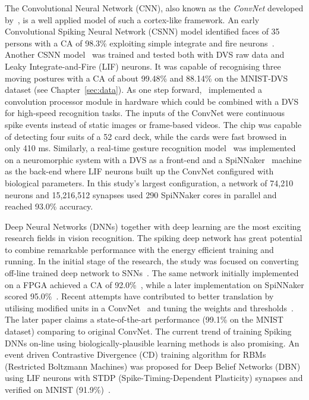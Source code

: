 \documentclass{frontiersENG} %
\begin{document}
The Convolutional Neural Network (CNN), also known as the \textit{ConvNet} developed by~\cite{lecun1998gradient}, is a well applied model of such a cortex-like framework.
An early Convolutional Spiking Neural Network (CSNN) model identified faces of 35 persons with a CA of 98.3\% exploiting simple integrate and fire neurons~\citep{matsugu2002convolutional}.
Another CSNN model~\citep{zhao2014feedforward} was trained and tested both with DVS raw data and Leaky Integrate-and-Fire (LIF) neurons.
It was capable of recognising three moving postures with a CA of about 99.48\% and 88.14\% on the MNIST-DVS dataset (see Chapter~\ref{sec:data}).
As one step forward,~\cite{camunas2012event} implemented a convolution processor module in hardware which could be combined with a DVS for high-speed recognition tasks.
The inputs of the ConvNet were continuous spike events instead of static images or frame-based videos. 
The chip was capable of detecting four suits of a 52 card deck, while the cards were fast browsed in only 410 ms.
Similarly, a real-time gesture recognition model~\citep{liu2014real} was implemented on a neuromorphic system with a DVS as a front-end and a SpiNNaker~\citep{furber2014spinnaker} machine as the back-end where LIF neurons built up the ConvNet configured with biological parameters.
In this study's largest configuration, a network of 74,210 neurons and 15,216,512 synapses used 290 SpiNNaker cores in parallel and reached 93.0\% accuracy. 

Deep Neural Networks (DNNs) together with deep learning are the most exciting research fields in vision recognition.
The spiking deep network has great potential to combine remarkable performance with the energy efficient training and running.
In the initial stage of the research, the study was focused on converting off-line trained deep network to SNNs~\citep{o2013real}.
The same network initially implemented on a FPGA achieved a CA of 92.0\%~\citep{neil2014minitaur}, while a later implementation on SpiNNaker scored 95.0\%~\citep{Stromatias2015scalable}.
Recent attempts have contributed to better translation by utilising modified units in a ConvNet~\citep{cao2015spiking} and tuning the weights and thresholds~\citep{Diehl2015fast}.
The later paper claims a state-of-the-art performance (99.1\% on the MNIST dataset) comparing to original ConvNet.
The current trend of training Spiking DNNs on-line using biologically-plausible learning methods is also promising.
An event driven Contrastive Divergence (CD) training algorithm for RBMs (Restricted Boltzmann Machines) was proposed for Deep Belief Networks (DBN) using LIF neurons with STDP (Spike-Timing-Dependent Plasticity) synapses and verified on MNIST (91.9\%)~\citep{neftci2013event}.
\end{document}
